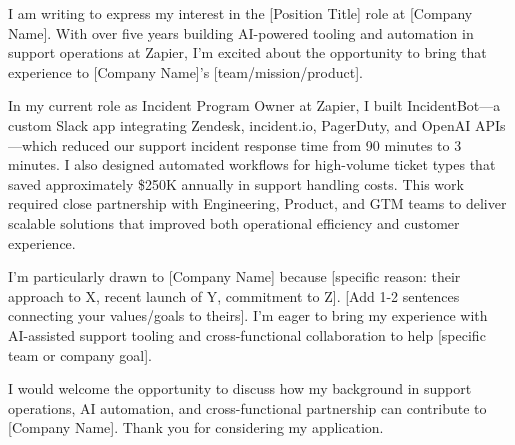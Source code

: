 \documentclass[11pt,a4paper,sans]{moderncv}
\date{\today}
\begin{document}
\makelettertitle

I am writing to express my interest in the [Position Title] role at [Company Name].
With over five years building AI-powered tooling and automation in support operations
at Zapier, I'm excited about the opportunity to bring that experience to [Company Name]'s
[team/mission/product].

In my current role as Incident Program Owner at Zapier, I built IncidentBot---a
custom Slack app integrating Zendesk, incident.io, PagerDuty, and OpenAI APIs---which
reduced our support incident response time from 90 minutes to 3 minutes. I also
designed automated workflows for high-volume ticket types that saved approximately
\$250K annually in support handling costs. This work required close partnership
with Engineering, Product, and GTM teams to deliver scalable solutions that improved
both operational efficiency and customer experience.

I'm particularly drawn to [Company Name] because [specific reason: their approach
to X, recent launch of Y, commitment to Z]. [Add 1-2 sentences connecting your
values/goals to theirs]. I'm eager to bring my experience with AI-assisted support
tooling and cross-functional collaboration to help [specific team or company goal].

I would welcome the opportunity to discuss how my background in support operations,
AI automation, and cross-functional partnership can contribute to [Company Name].
Thank you for considering my application.

\makeletterclosing
\end{document}
